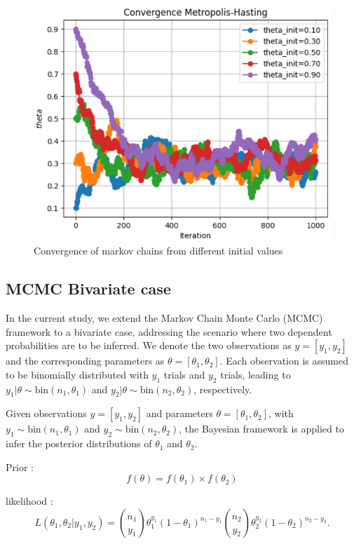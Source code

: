 \begin{figure}[htbp]
    \centering
    \includegraphics[width=\linewidth]{plots/output_univar.png}
    \caption{Convergence of markov chains from different initial values}
    \label{fig:my_label}
\end{figure}
    
\subsection*{MCMC Bivariate case}

In the current study, we extend the Markov Chain Monte Carlo (MCMC) framework to a bivariate case, addressing the scenario where two dependent probabilities are to be inferred. We denote the two observations as \( y = [y_1, y_2] \) and the corresponding parameters as \( \theta = [\theta_1, \theta_2] \). Each observation is assumed to be binomially distributed with \( y_1 \) trials and \( y_2 \) trials, leading to \( y_1 | \theta \sim \text{bin}(n_1, \theta_1) \) and \( y_2 | \theta \sim \text{bin}(n_2, \theta_2) \), respectively.

Given observations $y = [y_1, y_2]$ and parameters $\theta = [\theta_1, \theta_2]$, with $y_1 \sim \text{bin}(n_1, \theta_1)$ and $y_2 \sim \text{bin}(n_2, \theta_2)$, the Bayesian framework is applied to infer the posterior distributions of $\theta_1$ and $\theta_2$.


Prior :
\[f(\theta) = f(\theta_1) \times f(\theta_2)\]

likelihood :
\[
L(\theta_1, \theta_2 | y_1, y_2) = \binom{n_1}{y_1} \theta_1^{y_1} (1 - \theta_1)^{n_1-y_1} \binom{n_2}{y_2} \theta_2^{y_2} (1 - \theta_2)^{n_2-y_2}.
\]

